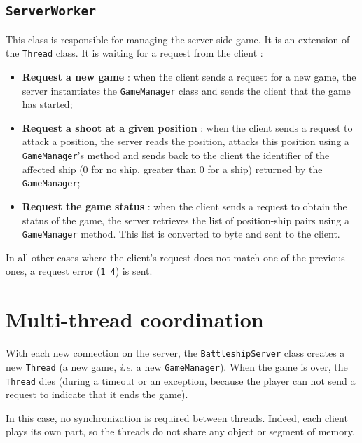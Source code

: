 \documentclass[a4paper, 12pt]{article}
\begin{document}
	\subsection{\texttt{ServerWorker}}
	This class is responsible for managing the server-side game. It is an extension of the \texttt{Thread} class. It is waiting for a request from the client :
	\begin{itemize}
		\item {\bf Request a new game} : when the client sends a request for a new game, the server instantiates the \texttt{GameManager} class and sends the client that the game has started;
		\item {\bf Request a shoot at a given position} : when the client sends a request to attack a position, the server reads the position, attacks this position using a \texttt{GameManager}'s method and sends back to the client the identifier of the affected ship (0 for no ship, greater than 0 for a ship) returned by the \texttt{GameManager};
		\item {\bf Request the game status} : when the client sends a request to obtain the status of the game, the server retrieves the list of position-ship pairs using a \texttt{GameManager} method. This list is converted to byte and sent to the client.
	\end{itemize}
	In all other cases where the client's request does not match one of the previous ones, a request error (\texttt{1 4}) is sent.
	\section{Multi-thread coordination}
	With each new connection on the server, the \texttt{BattleshipServer} class creates a new \texttt{Thread} (a new game, {\it i.e.} a new \texttt{GameManager}). When the game is over, the \texttt{Thread} dies (during a timeout or an exception, because the player can not send a request to indicate that it ends the game).\par
	In this case, no synchronization is required between threads. Indeed, each client plays its own part, so the threads do not share any object or segment of memory.
\end{document}
